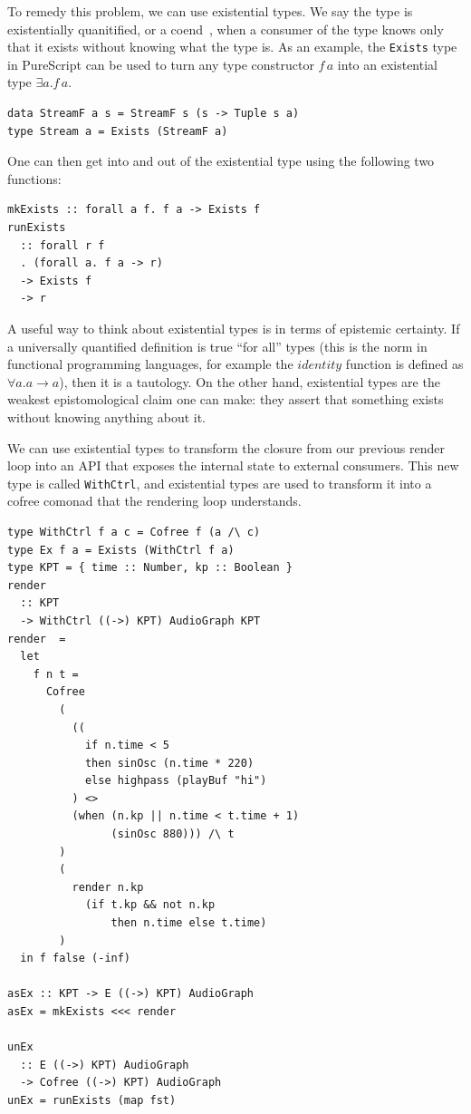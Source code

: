 \documentclass{article}
\begin{document}
To remedy this problem, we can use existential types. We say the type is existentially quanitified, or a coend~\cite{yoneda1960ext}, when a consumer of the type knows only that it exists without knowing what the type is. As an example, the \texttt{Exists} type in PureScript can be used to turn any type constructor $f\,a$ into an existential type $\exists a. f\,a$.

\lstset{language=Haskell, style=psstyle}
\begin{lstlisting}
data StreamF a s = StreamF s (s -> Tuple s a)
type Stream a = Exists (StreamF a)
\end{lstlisting}

One can then get into and out of the existential type using the following two functions:

\lstset{language=Haskell, style=psstyle}
\begin{lstlisting}
mkExists :: forall a f. f a -> Exists f
runExists
  :: forall r f
  . (forall a. f a -> r)
  -> Exists f
  -> r
\end{lstlisting}

A useful way to think about existential types is in terms of epistemic certainty. If a universally quantified definition is true ``for all'' types (this is the norm in functional programming languages, for example the $identity$ function is defined as $\forall a. a \rightarrow a$), then it is a tautology. On the other hand, existential types are the weakest epistomological claim one can make: they assert that something exists without knowing anything about it.

We can use existential types to transform the closure from our previous render loop into an API that exposes the internal state to external consumers. This new type is called \texttt{WithCtrl}, and existential types are used to transform it into a cofree comonad that the rendering loop understands.

\lstset{language=Haskell, style=psstyle}
\begin{lstlisting}
type WithCtrl f a c = Cofree f (a /\ c)
type Ex f a = Exists (WithCtrl f a)
type KPT = { time :: Number, kp :: Boolean }
render
  :: KPT
  -> WithCtrl ((->) KPT) AudioGraph KPT
render  =
  let
    f n t =
      Cofree
        (
          ((
            if n.time < 5
            then sinOsc (n.time * 220)
            else highpass (playBuf "hi")
          ) <>
          (when (n.kp || n.time < t.time + 1)
                (sinOsc 880))) /\ t
        )
        (
          render n.kp
            (if t.kp && not n.kp
                then n.time else t.time)
        )
  in f false (-inf)

asEx :: KPT -> E ((->) KPT) AudioGraph
asEx = mkExists <<< render

unEx
  :: E ((->) KPT) AudioGraph
  -> Cofree ((->) KPT) AudioGraph
unEx = runExists (map fst)
\end{lstlisting}
\end{document}
